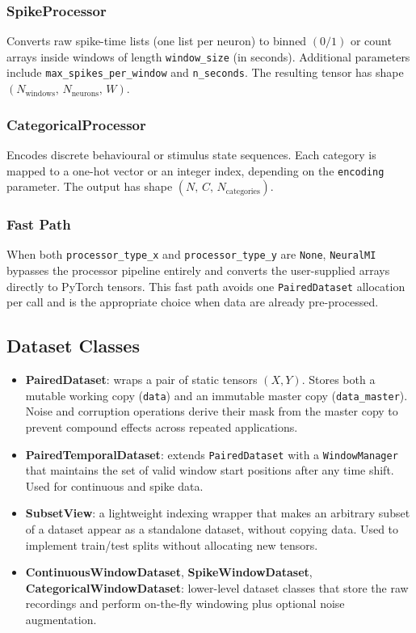 \documentclass[12pt]{article}
\newcommand{\nmi}{\texttt{NeuralMI}}
\newcommand{\api}[1]{\texttt{#1}}
\begin{document}
\subsubsection{SpikeProcessor}
Converts raw spike-time lists (one list per neuron) to binned
\mbox{$(0/1)$} or count arrays inside windows of length
\api{window\_size} (in seconds).  Additional parameters include
\api{max\_spikes\_per\_window} and \api{n\_seconds}.  The resulting
tensor has shape $(N_{\mathrm{windows}},\,N_{\mathrm{neurons}},\,W)$.

\subsubsection{CategoricalProcessor}
Encodes discrete behavioural or stimulus state sequences.  Each category
is mapped to a one-hot vector or an integer index, depending on the
\api{encoding} parameter.  The output has shape
$(N,\,C,\,N_{\mathrm{categories}})$.

\subsubsection{Fast Path}
When both \api{processor\_type\_x} and \api{processor\_type\_y} are
\api{None}, \nmi{} bypasses the processor pipeline entirely and converts
the user-supplied arrays directly to PyTorch tensors.  This fast path
avoids one \api{PairedDataset} allocation per call and is the appropriate
choice when data are already pre-processed.

\subsection{Dataset Classes}
\label{sec:data:datasets}

\begin{itemize}[leftmargin=*]
  \item \textbf{PairedDataset}: wraps a pair of static tensors $(X, Y)$.
        Stores both a mutable working copy (\api{data}) and an immutable
        master copy (\api{data\_master}).  Noise and corruption operations
        derive their mask from the master copy to prevent compound effects
        across repeated applications.

  \item \textbf{PairedTemporalDataset}: extends \api{PairedDataset} with
        a \api{WindowManager} that maintains the set of valid window start
        positions after any time shift.  Used for continuous and spike
        data.

  \item \textbf{SubsetView}: a lightweight indexing wrapper that makes an
        arbitrary subset of a dataset appear as a standalone dataset,
        without copying data.  Used to implement train/test splits without
        allocating new tensors.

  \item \textbf{ContinuousWindowDataset}, \textbf{SpikeWindowDataset},
        \textbf{CategoricalWindowDataset}: lower-level dataset classes that
        store the raw recordings and perform on-the-fly windowing plus
        optional noise augmentation.
\end{itemize}
\end{document}

